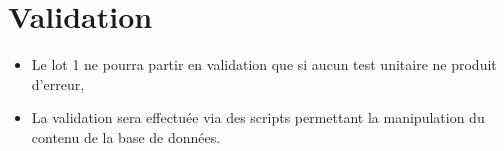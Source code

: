 \section{Validation}	
	\begin{itemize}
		\item Le lot 1 ne pourra partir en validation que si aucun test unitaire ne produit d'erreur,
		\item La validation sera effectuée via des scripts permettant la manipulation du contenu de la base de données.
	\end{itemize}
	
